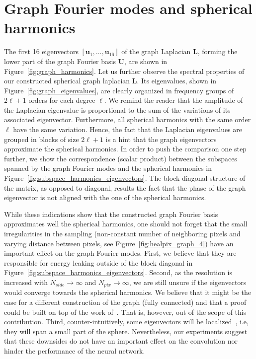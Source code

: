 \documentclass[final,twocolumn,3p,times,authoryear]{elsarticle}
\newcommand{\figref}[1]{Figure~\ref{fig:#1}}
\renewcommand{\b}[1]{{\bm{#1}}}   %
\newcommand{\1}{\b{1}}              %
\newcommand{\0}{\b{0}}              %
\renewcommand{\L}{\b{L}}
\newcommand{\U}{\b{U}}
\begin{document}
\section{Graph Fourier modes and spherical harmonics}
\label{sec:comparison_spherical_harmonics}
The first 16 eigenvectors $[\b u_1, \ldots, \b u_{16}]$ of the graph Laplacian $\L$, forming the lower part of the graph Fourier basis $\U$, are shown in \figref{graph_harmonics}. 
Let us further observe the spectral properties of our constructed spherical graph laplacian $\L$. 
Its eigenvalues, shown in \figref{graph_eigenvalues}, are clearly organized in frequency groups of $2\ell + 1$ orders for each degree $\ell$.
We remind the reader that the amplitude of the Laplacian eigenvalue is proportional to the sum of the variations of its associated eigenvector. Furthermore, all spherical harmonics with the same order $\ell$ have the same variation. Hence, the fact that the Laplacian eigenvalues are grouped in blocks of size $2\ell + 1$ is a hint that the graph eigenvectors approximate the spherical harmonics.
In order to push the comparison one step further, we show the correspondence (scalar product) between the subspaces spanned by the graph Fourier modes and the spherical harmonics in \figref{subspace_harmonics_eigenvectors}. 
The block-diagonal structure of the matrix, as opposed to diagonal, results the fact that the phase of the graph eigenvector is not aligned with the one of the spherical harmonics.

While these indications show that the constructed graph Fourier basis approximates well the spherical harmonics, one should not forget that the small irregularities in the sampling (non-constant number of neighboring pixels and varying distance between pixels, see \figref{healpix_graph_4}) have an important effect on the graph Fourier modes.
First, we believe that they are responsible for energy leaking outside of the block diagonal in \figref{subspace_harmonics_eigenvectors}. 
Second, as the resolution is increased with $N_{side} \rightarrow \infty$ and $N_{pix} \rightarrow \infty$, we are still unsure if the eigenvectors would converge towards the spherical harmonics. We believe that it might be the case for a different construction of the graph (fully connected) and that a proof could be built on top of the work of~\cite{belkin2007convergence}. That is, however, out of the scope of this contribution.
Third, counter-intuitively, some eigenvectors will be localized~\citep{perraudin2018global}, i.e, they will span a small part of the sphere. 
Nevertheless, our experiments suggest that these downsides do not have an important effect on the convolution nor hinder the performance of the neural network.
\end{document}
